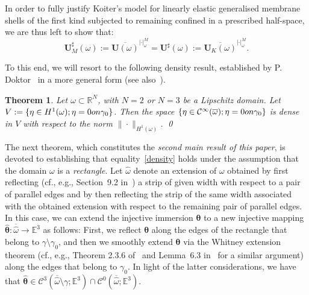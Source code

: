 \documentclass{amsart}
\newtheorem{theorem}{Theorem}[section]
\begin{document}
In order to fully justify Koiter's model for linearly elastic generalised membrane shells of the first kind subjected to remaining confined in a prescribed half-space, we are thus left to show that:
\begin{equation}
	\label{density}
	\bm{U}_M^\sharp(\omega) := \overline{\bm{U}(\omega)}^{|\cdot|_\omega^M}=\bm{U}^\sharp(\omega):=\overline{\bm{U}_K(\omega)}^{|\cdot|_\omega^M}.
\end{equation}

To this end, we will resort to the following density result, established by P. Doktor~\cite{Dok73} in a more general form (see also~\cite{DZ06}).

\begin{theorem}
	\label{DoktorDensity}
	Let $\omega \subset \mathbb{R}^N$, with $N=2$ or $N=3$ be a Lipschitz domain.
	Let $V:=\{\eta \in H^1(\omega);\eta=0 \textup{ on }\gamma_0\}$.
	Then the space $\{\eta \in \mathcal{C}^\infty(\overline{\omega});\eta=0 \textup{ on }\gamma_0\}$ is dense in $V$ with respect to the norm $\|\cdot\|_{H^1(\omega)}$.
	\qed
\end{theorem}

The next theorem, which constitutes the \emph{second main result of this paper}, is devoted to establishing that equality~\eqref{density} holds under the assumption that the domain $\omega$ is a \emph{rectangle}. Let $\hat{\omega}$ denote an extension of $\omega$ obtained by first reflecting (cf., e.g., Section~9.2 in~\cite{Brez11}) a strip of given width with respect to a pair of parallel edges and by then reflecting the strip of the same width associated with the obtained extension with respect to the remaining pair of parallel edges.
In this case, we can extend the injective immersion $\bm{\theta}$ to a new injective mapping $\hat{\bm{\theta}}:\overline{\hat{\omega}}\to\mathbb{E}^3$ as follows: First, we reflect $\bm{\theta}$ along the edges of the rectangle that belong to $\gamma\setminus\gamma_0$, and then we smoothly extend $\bm{\theta}$ via the Whitney extension theorem (cf., e.g., Theorem 2.3.6 of~\cite{Hormander1990} and Lemma~6.3 in~\cite{MeiPie2024} for a similar argument) along the edges that belong to $\gamma_0$. In light of the latter considerations, we have that $\hat{\bm{\theta}} \in \mathcal{C}^3(\overline{\hat{\omega}}\setminus\gamma;\mathbb{E}^3) \cap \mathcal{C}^0(\overline{\hat{\omega}};\mathbb{E}^3)$.
\end{document}
